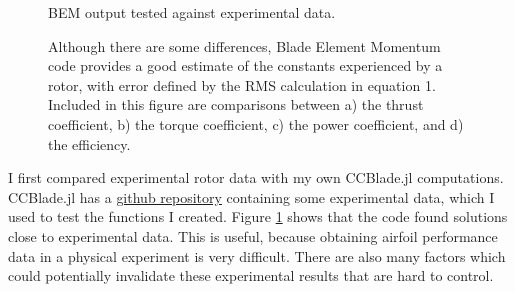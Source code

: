 \documentclass{article}
\begin{document}
\begin{figure}
  \centering

  \hspace{1em}
  \caption{BEM output tested against experimental data.}
  \captionsetup{aboveskip=0pt,font=it}
  \caption*{Although there are some differences, Blade Element Momentum code provides a good estimate of the constants experienced by a rotor, with error defined by the RMS calculation in equation 1. Included in this figure are comparisons between a) the thrust coefficient, b) the torque coefficient, c) the power coefficient, and d) the efficiency.}
  \label{fig:2}
\end{figure}

I first compared experimental rotor data with my own CCBlade.jl computations. CCBlade.jl has a \href{https://github.com/byuflowlab/CCBlade.jl}{github repository} containing some experimental data, which I used to test the functions I created. Figure \ref{fig:2} shows that the code found solutions close to experimental data. This is useful, because obtaining airfoil performance data in a physical experiment is very difficult. There are also many factors which could potentially invalidate these experimental results that are hard to control. \newline
\end{document}

